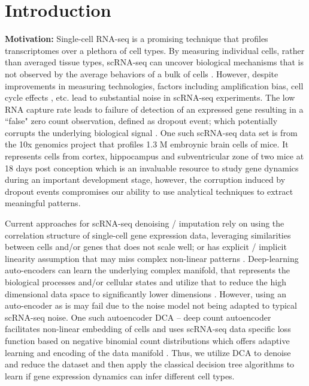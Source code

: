 \section*{Introduction}

\textbf{Motivation:} Single-cell RNA-seq is a promising technique that profiles transcriptomes over a plethora of cell types. By measuring individual cells, rather than averaged tissue types, scRNA-seq can uncover biological mechanisms that is not observed by the average behaviors of a bulk of cells  \citep{wang2017vasc}. However, despite improvements in measuring technologies, factors including amplification bias, cell cycle effects \citep{buettner2015computational}, etc. lead to substantial noise in scRNA-seq experiments. The low RNA capture rate leads to failure of detection of an expressed gene resulting in a ``false" zero count observation, defined as dropout event; which potentially corrupts the underlying biological signal \cite{eraslan2018single}. One such scRNA-seq data set is from the 10x genomics project that  profiles 1.3 M embroynic brain cells of mice. It represents cells from cortex, hippocampus and subventricular zone of two mice at 18 days post conception which is an invaluable resource to study gene dynamics during an important development stage, however, the corruption induced by dropout events compromises our ability to use analytical techniques to extract meaningful patterns. 

Current approaches for scRNA-seq denoising / imputation rely on using the correlation structure of single-cell gene expression data, leveraging similarities between cells and/or genes that does not scale well; or has explicit / implicit linearity assumption that may miss complex non-linear patterns \citep{eraslan2018single}. Deep-learning auto-encoders can learn the underlying complex manifold, that represents the biological processes and/or cellular states and utilize that to reduce the high dimensional data space to significantly lower dimensions \citep{moon2017manifold}. However, using an auto-encoder as is may fail due to the noise model not being adapted to typical scRNA-seq noise. One such autoencoder DCA -- deep count autoencoder facilitates non-linear embedding of cells and uses scRNA-seq data specific loss function based on negative binomial count distributions which offers adaptive learning and encoding of the data manifold \citep{eraslan2018single}. Thus, we utilize DCA to denoise and reduce the dataset and then apply the classical decision tree algorithms to learn if gene expression dynamics can infer different cell types.

